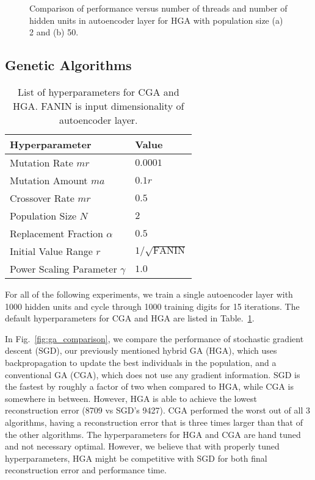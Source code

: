 \begin{figure*}[h]
	\centering
	\caption{Comparison of performance versus number of threads and number of hidden units in autoencoder layer for HGA with population size (a) 2 and (b) 50.}
	\label{fig:ga_comparison3}
\end{figure*}

\subsection{Genetic Algorithms}

\begin{table}[h]
  \centering
\begin{tabular}{l|l}
Hyperparameter     & Value                                                          \\ \hline
Mutation Rate $mr$ & $0.0001$ \\
Mutation Amount $ma$ & $0.1r$ \\
Crossover Rate $mr$ & $0.5$ \\
Population Size $N$ & $2$ \\
Replacement Fraction $\alpha$ & $0.5$ \\
Initial Value Range $r$ & $1/\sqrt{\text{FANIN}}$ \\
Power Scaling Parameter $\gamma$ & $1.0$ \\

\end{tabular}
\caption{List of hyperparameters for CGA and HGA. FANIN is input dimensionality of autoencoder layer.}
\label{tab:hyperparameters}
\end{table}

For all of the following experiments, we train a single autoencoder layer with 1000 hidden units and cycle through 1000 training digits for 15 iterations. The default hyperparameters for CGA and HGA are listed in Table.~\ref{tab:hyperparameters}. 

In Fig.~\ref{fig:ga_comparison}, we compare the performance of stochastic gradient descent (SGD), our previously mentioned hybrid GA (HGA), which uses backpropagation to update the best individuals in the population, and a conventional GA (CGA), which does not use any gradient information. SGD is the fastest by roughly a factor of two when compared to HGA, while CGA is somewhere in between. However, HGA is able to achieve the lowest reconstruction error (8709 vs SGD's 9427). CGA performed the worst out of all 3 algorithms, having a reconstruction error that is three times larger than that of the other algorithms. The hyperparameters for HGA and CGA are hand tuned and not necessary optimal. However, we believe that with properly tuned hyperparameters, HGA might be competitive with SGD for both final reconstruction error and performance time. 

